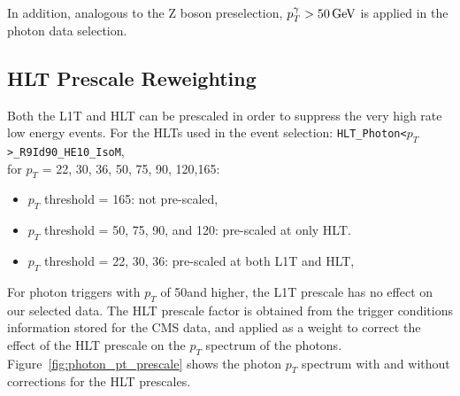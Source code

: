 In addition, analogous to the Z boson preselection, $p_T ^{\gamma} > 50\,\text{Ge\hspace{-.08em}V}$ is applied in the photon data selection.

\subsection{\boldmath{\gjets} HLT Prescale Reweighting}\label{sec:bg_gjetHLT}
Both the L1T and HLT can be prescaled in order to suppress the very high rate low energy events. For the HLTs used in the \gjets event selection:
\texttt{HLT\_Photon<$p_T$>\_R9Id90\_HE10\_IsoM}, \\
 for $p_T$ = 22, 30, 36, 50, 75, 90, 120,165\GeV:
\begin{itemize}
\item $p_T$ threshold = 165\GeV: not pre-scaled, 
\item $p_T$ threshold = 50, 75, 90, and 120\GeV:  pre-scaled at only HLT.  
\item $p_T$ threshold = 22, 30, 36\GeV: pre-scaled at both L1T and HLT, 
\end{itemize}

For photon triggers with $p_T$ of 50\GeV and higher, the L1T prescale has no effect on our selected data. The HLT prescale factor is obtained from the trigger conditions information stored for the CMS data, and applied as a weight to correct the effect of the HLT prescale on the $p_T$ spectrum of the photons. Figure~\ref{fig:photon_pt_prescale} shows the photon $p_T$ spectrum with and without corrections for the HLT prescales.



